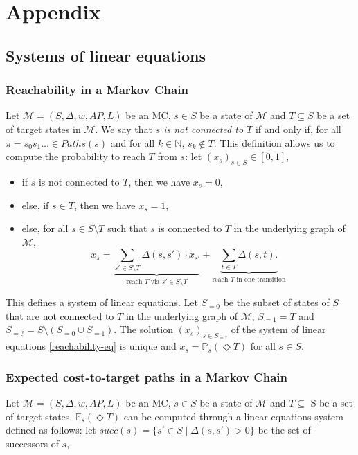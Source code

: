 \chapter*{Appendix}
\renewcommand{\thechapter}{\Alph{chapter}}
\setcounter{chapter}{1}

\section{Systems of linear equations}
\subsection{Reachability in a Markov Chain}\label{app-reach}
Let $\mathcal{M} = (S, \Delta, w, AP, L)$ be an MC, $s \in S$ be a state of $\mathcal{M}$ and $T \subseteq S$ be a set of target states in $\mathcal{M}$.
We say that \textit{$s$ is not connected to $T$} if and only if, for all $\pi = s_0s_1\dots \in Paths(s)$ and for all $k \in \mathbb{N}$, $s_k \not\in T$.
This definition allows us to compute the probability to reach $T$ from $s$:
let $(x_s)_{s \in S} \in [0, 1]$,
\begin{itemize}
	\item if $s$ is not connected to $T$, then we have $x_s = 0$,
	\item else, if $s \in T$, then we have $x_s = 1$,
	\item else, for all $s \in S \setminus T$  such that $s$ is connected to $T$ in the underlying graph of $\mathcal{M}$,
		\begin{equation}
      x_s = \underbrace{\sum_{s' \in S \setminus T} \Delta(s, s') \cdot x_{s'}}_{\text{reach $T$ via $s' \in S \setminus T$}} + \underbrace{\sum_{t \in T} \Delta(s, t).}_{\text{reach $T$ in one transition}}
			\tag{1}\label{reachability-eq}
		\end{equation}
\end{itemize}
This defines a system of linear equations.
Let $S_{=0}$ be the subset of states of $S$ that are not connected to $T$ in the underlying graph of $\mathcal{M}$, $S_{=1} = T$ and $S_{=?} = S \setminus (S_{=0} \cup S_{=1})$.
The solution $(x_s)_{s \in S_{=?}}$ of the system of linear equations \ref{reachability-eq} is unique and $x_s = \mathbb{P}_s(\Diamond T)$ for all $s \in S$.

\subsection{Expected cost-to-target paths in a Markov Chain}\label{app-expMC}
  Let $\mathcal{M} = (S, \Delta, w, AP, L)$ be an MC, $s \in S$ be a state of $\mathcal{M}$ and $T \subseteq$ S be a set of target states. $\mathbb{E}_s(\Diamond T)$ can be computed through a linear equations system defined as follows:
  let $succ(s) = \{ s' \in S \; | \; \Delta(s, s') > 0 \}$ be the set of successors of $s$,

